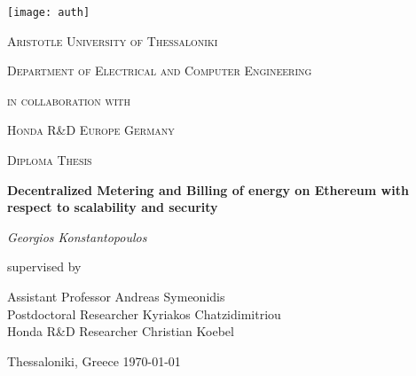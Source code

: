 \begin{titlepage}
	\centering
	\texttt{[image: auth]}\par\vspace{1cm}
	{\scshape\LARGE Aristotle University of Thessaloniki \par}
	{\scshape\Large Department of Electrical and Computer Engineering\par}
	\vspace{1cm}
	{\scshape\Large in collaboration with \par}
	{\scshape\LARGE Honda R\&D Europe Germany \par}
	\vspace{1cm}
	{\scshape\Large Diploma Thesis\par}
	\vspace{1.5cm}
	{\huge\bfseries Decentralized Metering and Billing of energy on Ethereum with respect to scalability and security \par}
	\vspace{2cm}
	{\Large\itshape Georgios Konstantopoulos\par}
	\vfill
	supervised by\par
	Assistant Professor Andreas Symeonidis\\
	Postdoctoral Researcher Kyriakos Chatzidimitriou\\
	Honda R\&D Researcher Christian Koebel 

	\vfill

	{\large Thessaloniki, Greece \today\par}
\end{titlepage}
